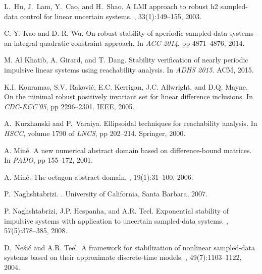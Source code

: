 \documentclass[letterpaper, 10 pt, conference]{ieeeconf}  %
\numberwithin{thm}{section}
\begin{document}
\begin{thebibliography}{10}
L.~Hu, J.~Lam, Y.~Cao, and H.~Shao.
\newblock A  {LMI} approach to robust h2 sampled- data control for linear
  uncertain systems.
, 33(1):149--155, 2003.

C.{-}Y. Kao and D.{-}R. Wu.
\newblock On robust stability of aperiodic sampled-data systems - an integral
  quadratic constraint approach.
\newblock In {\em ACC 2014}, pp 4871--4876, 2014.

M. Al Khatib, A. Girard, and T. Dang.
\newblock Stability verification of nearly periodic impulsive linear systems
  using reachability analysis.
\newblock In {\em ADHS 2015}. ACM, 2015.

K.I. Kouramas, S.V. Rakovi{\'c}, E.C. Kerrigan, J.C. Allwright, and D.Q. Mayne.
\newblock On the minimal robust positively invariant set for linear difference
  inclusions.
\newblock In {\em CDC-ECC'05}, pp 2296--2301. IEEE,
  2005.

A.~Kurzhanski and P.~Varaiya.
\newblock Ellipsoidal techniques for reachability analysis.
\newblock In {\em HSCC}, volume 1790 of {\em {LNCS}}, pp 202--214.
  {Springer}, 2000.

A. Min{\'e}.
\newblock A new numerical abstract domain based on difference-bound matrices.
\newblock In {\em PADO}, pp 155--172, 2001.

A. Min{\'e}.
\newblock The octagon abstract domain.
, 19(1):31--100, 2006.

P.~Naghshtabrizi.
.
\newblock University of California, Santa Barbara, 2007.

P. Naghshtabrizi, J.P. Hespanha, and A.R. Teel.
\newblock Exponential stability of impulsive systems with application to
  uncertain sampled-data systems.
, 57(5):378--385, 2008.

D.~Ne{\v{s}}i{\'c} and A.R. Teel.
\newblock A framework for stabilization of nonlinear sampled-data systems based
  on their approximate discrete-time models.
, 49(7):1103--1122, 2004.



\end{thebibliography}
\end{document}
